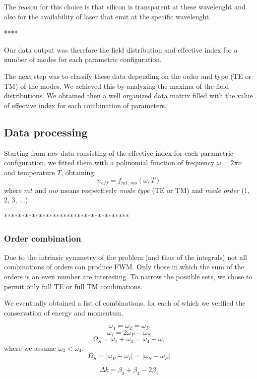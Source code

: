 \documentclass[12pt,a4paper,twoside]{article}
\begin{document}
The reason for this choice is that silicon is transparent at these wavelenght and also for the availability of laser that emit at the specific wavelenght.

\vspace{18pt}
****
\vspace{12pt}

Our data output was therefore the field distribution and effective index for a number of modes for each parametric configuration.

The next step was to classify these data depending on the order and type (TE or TM) of the modes.
We achieved this by analyzing the maxima of the field distributions.
We obtained then a well organized data matrix filled with the value of effective index for each combination of parameters.

\subsection{Data processing}
Starting from raw data consisting of the effective index for each parametric configuration, we fitted them with a polinomial function of frequency $\omega = 2\pi \nu$ and temperature $T$, obtaining:
$$n_{eff} = f_{mt,\,mo} \left( \omega, T \right)$$
where $mt$ and $mo$ means respectively \textit{mode type} (TE or TM) and \textit{mode order} (1, 2, 3, ...)

\vspace{18pt}
************************************

\subsubsection*{Order combination}

Due to the intrinsic symmetry of the problem (and thus of the integrals) not all combinations of orders can produce FWM.
Only those in which the sum of the orders is an even number are interesting.
To narrow the possible sets, we chose to permit only full TE or full TM  combinations.

We eventually obtained a list of combinations, for each of which we verified the conservation of energy and momentum.


$$\omega_1 = \omega_2 = \omega_P$$
$$\omega_I = 2\omega_P - \omega_S$$
$$\Omega_S = \omega_1 + \omega_3 = \omega_4 - \omega_1$$
where we assume $\omega_3 < \omega_4$.
$$\Omega_S = |\omega_P - \omega_I| = |\omega_S - \omega_P|$$

$$\Delta k = \beta_3 + \beta_4 - 2\beta_1$$
\end{document}
